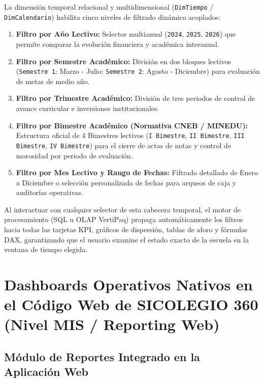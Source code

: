 \documentclass[12pt,a4paper,oneside]{report}
\begin{document}
    La dimensión temporal relacional y multidimensional (\texttt{DimTiempo} / \texttt{DimCalendario}) habilita cinco niveles de filtrado dinámico acoplados:

    \begin{enumerate}
        \item \textbf{Filtro por Año Lectivo:} Selector multianual (\texttt{2024}, \texttt{2025}, \texttt{2026}) que permite comparar la evolución financiera y académica interanual.
        \item \textbf{Filtro por Semestre Académico:} División en dos bloques lectivos (\texttt{Semestre 1}: Marzo - Julio; \texttt{Semestre 2}: Agosto - Diciembre) para evaluación de metas de medio año.
        \item \textbf{Filtro por Trimestre Académico:} División de tres periodos de control de avance curricular e inversiones institucionales.
        \item \textbf{Filtro por Bimestre Académico (Normativa CNEB / MINEDU):} Estructura oficial de 4 Bimestres lectivos (\texttt{I Bimestre}, \texttt{II Bimestre}, \texttt{III Bimestre}, \texttt{IV Bimestre}) para el cierre de actas de notas y control de morosidad por periodo de evaluación.
        \item \textbf{Filtro por Mes Lectivo y Rango de Fechas:} Filtrado detallado de Enero a Diciembre o selección personalizada de fechas para arqueos de caja y auditorías operativas.
    \end{enumerate}

    Al interactuar con cualquier selector de esta cabecera temporal, el motor de procesamiento (SQL u OLAP VertiPaq) propaga automáticamente los filtros hacia todas las tarjetas KPI, gráficos de dispersión, tablas de aforo y fórmulas DAX, garantizando que el usuario examine el estado exacto de la escuela en la ventana de tiempo elegida.

    \chapter{Dashboards Operativos Nativos en el Código Web de SICOLEGIO 360 (Nivel MIS / Reporting Web)}

    \section{Módulo de Reportes Integrado en la Aplicación Web}
\end{document}

